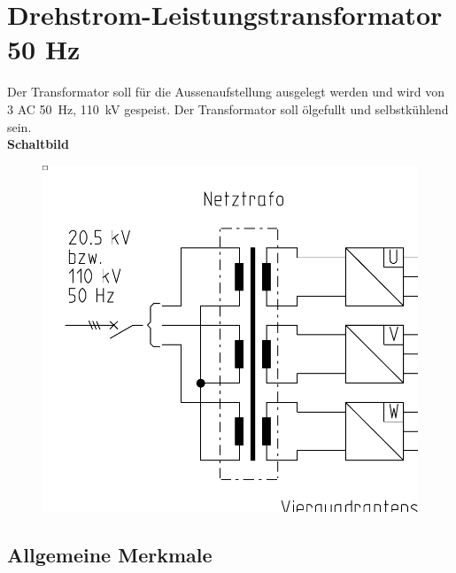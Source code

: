 \section{Drehstrom-Leistungstransformator 50 Hz}
Der Transformator soll für die Aussenaufstellung ausgelegt werden und wird von 3 AC \SI[]{50}[]{\Hz}, \SI[]{110}[]{\kilo\volt} gespeist.
Der Transformator soll ölgefullt und selbstkühlend sein.\\ 

\textbf{Schaltbild}
\begin{figure}[htb]
\centering
\includegraphics[width=\textwidth/2]{Bilder/netztrafo.png}
\end{figure}

\subsection{Allgemeine Merkmale}

